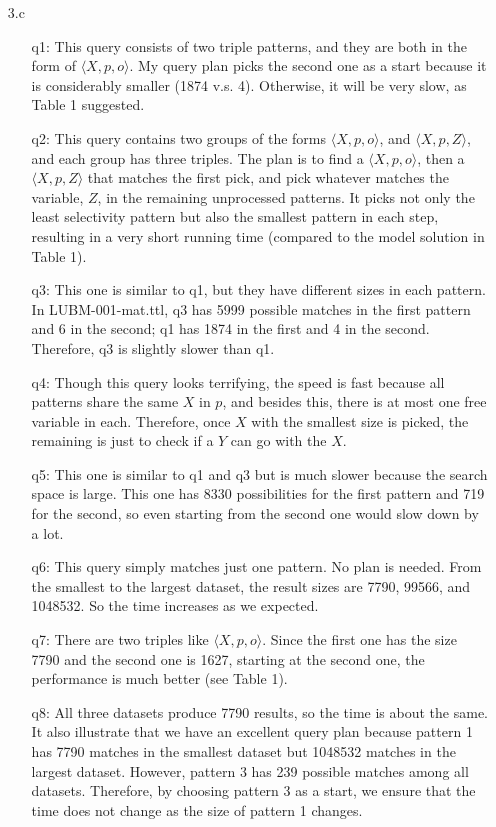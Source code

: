 \documentclass{article}
\begin{document}
\begin{enumerate}
\item[3.c]
\begin{enumerate}
\item[q1:] This query consists of two triple patterns, and they are both in the form of $\langle X, p, o\rangle$. My query plan picks the second one as a start because it is considerably smaller (1874 v.s. 4). Otherwise, it will be very slow, as Table 1 suggested. 

\item[q2:] This query contains two groups of the forms $\langle X, p, o\rangle$, and $\langle X, p, Z\rangle$, and each group has three triples. The plan is to find a $\langle X, p, o\rangle$, then a $\langle X, p, Z\rangle$ that matches the first pick, and pick whatever matches the variable, $Z$, in the remaining unprocessed patterns. It picks not only the least selectivity pattern but also the smallest pattern in each step, resulting in a very short running time (compared to the model solution in Table 1). 
\item[q3:] This one is similar to q1, but they have different sizes in each pattern. In LUBM-001-mat.ttl, q3 has 5999 possible matches in the first pattern and 6 in the second; q1 has 1874 in the first and 4 in the second. Therefore, q3 is slightly slower than q1. 
\item[q4:] Though this query looks terrifying, the speed is fast because all patterns share the same $X$ in $p$, and besides this, there is at most one free variable in each. Therefore, once $X$ with the smallest size is picked, the remaining is just to check if a $Y$ can go with the $X$. 
\item[q5:] This one is similar to q1 and q3 but is much slower because the search space is large. This one has 8330 possibilities for the first pattern and  719 for the second, so even starting from the second one would slow down by a lot. 
\item[q6:] This query simply matches just one pattern. No plan is needed. From the smallest to the largest dataset, the result sizes are 7790, 99566, and 1048532. So the time increases as we expected.
\item[q7:] There are two triples like $\langle X, p, o\rangle$. Since the first one has the size 7790 and the second one is 1627, starting at the second one, the performance is much better (see Table 1). 
\item[q8:] All three datasets produce 7790 results, so the time is about the same. It also illustrate that we have an excellent query plan because pattern 1 has 7790 matches in the smallest dataset but 1048532 matches in the largest dataset. However, pattern 3 has 239 possible matches among all datasets. Therefore, by choosing pattern 3 as a start, we ensure that the time does not change as the size of pattern 1 changes. 

\end{enumerate}
\end{enumerate}
\end{document}
